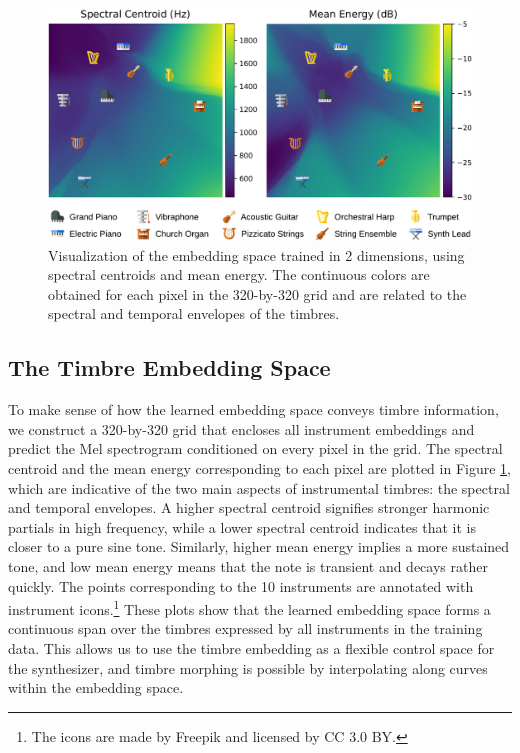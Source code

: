 \begin{figure}[t]
	\centering
	\includegraphics[width=\columnwidth]{runpixels.pdf}
	\caption{Visualization of the embedding space trained in 2 dimensions, using spectral centroids and mean energy. The continuous colors are obtained for each pixel in the 320-by-320 grid and are related to the spectral and temporal envelopes of the timbres.}
	\label{fig:embedding}
	\vspace{-1em}
\end{figure}

\subsection{The Timbre Embedding Space}

To make sense of how the learned embedding space conveys timbre information, we construct a 320-by-320 grid that encloses all instrument embeddings and predict the Mel spectrogram conditioned on every pixel in the grid.
The spectral centroid and the mean energy corresponding to each pixel are plotted in Figure \ref{fig:embedding}, which are indicative of the two main aspects of instrumental timbres: the spectral and temporal envelopes.
A higher spectral centroid signifies stronger harmonic partials in high frequency, while a lower spectral centroid indicates that it is closer to a pure sine tone.
Similarly, higher mean energy implies a more sustained tone, and low mean energy means that the note is transient and decays rather quickly.
The points corresponding to the 10 instruments are annotated with instrument icons.\footnote{The icons are made by Freepik and licensed by CC 3.0 BY.}
These plots show that the learned embedding space forms a continuous span over the timbres expressed by all instruments in the training data.
This allows us to use the timbre embedding as a flexible control space for the synthesizer, and timbre morphing is possible by interpolating along curves within the embedding space.

